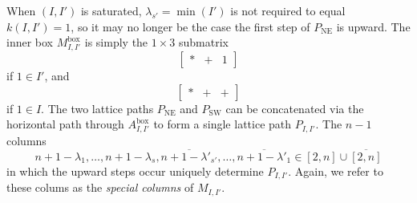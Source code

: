 \documentclass[12pt]{amsart}
\DeclareMathOperator{\inbox}{box}
\DeclareMathOperator{\NE}{NE}
\DeclareMathOperator{\SW}{SW}
\begin{document}
When $(I,I')$ is saturated, $\lambda_{s'}=\min(I')$ is not required to equal $k(I,I')=1$, so it may no longer be the case the first step of $P_{\NE}$ is upward. The inner box $M^{\inbox}_{I,I'}$ is simply the $1\times 3$ submatrix
\begin{equation*}
\begin{bmatrix}
    * & + & 1
\end{bmatrix}
\end{equation*}
if $1\in I'$, and 
\begin{equation*}
\begin{bmatrix}
    * & + & +
\end{bmatrix}
\end{equation*}
if $1\in I$. The two lattice paths $P_{\NE}$ and $P_{\SW}$ can be concatenated via the horizontal path through $A^{\inbox}_{I,I'}$ to form a single lattice path $P_{I,I'}$. The $n-1$ columns
\begin{equation*}
    n+1-\lambda_1,\ldots,n+1-\lambda_s,\overline{n+1-\lambda'_{s'}},\ldots,\overline{n+1-\lambda'_1}\in[2,n]\cup\overline{[2,n]}
\end{equation*}
in which the upward steps occur uniquely determine $P_{I,I'}$. Again, we refer to these colums as the \emph{special columns} of $M_{I,I'}$.
\end{document}
